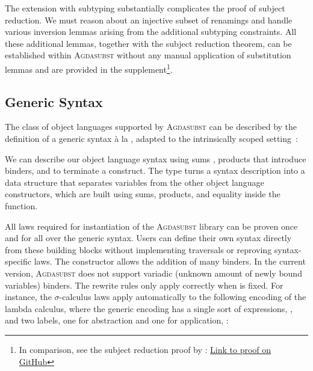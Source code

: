 \documentclass[screen,nonacm]{acmart}
\begin{document}
The extension with subtyping substantially complicates the proof of subject
reduction. We must reason about an injective subset of renamings and handle
various inversion lemmas arising from the additional subtyping constraints. All
these additional lemmas, together with the subject reduction theorem, can be
established within \textsc{Agdasubst} without any manual application of
substitution lemmas and are provided in the supplement\footnote{In comparison,
      see the subject reduction proof by \citet{saffrich:LIPIcs.ITP.2024.32}:
      \href{https://github.com/m0rphism/kitty/blob/bc86948c60f2d827593ad23e539197f9660178aa/src/Kitty/Examples/SystemFSub/SubjectReduction.agda\#L308}{Link
            to proof on GitHub}}.

\subsection{Generic Syntax}\label{sec:ext-uni}
The class of object languages supported by \textsc{Agdasubst} can be described
by the definition of a generic syntax à la
\citet{allais2021typescopesafeuniverse}, adapted to the intrinsically scoped
setting~\cite{saffrich:LIPIcs.ITP.2024.32}:

\noindent\begin{minipage}[t]{0.48\linewidth}
      \raggedright{}
      \GDesc{}
\end{minipage}
\begin{minipage}[t]{0.48\linewidth}
      \raggedright{}
      \GDenot{}
      \GTms{}
\end{minipage}

\noindent We can describe our object
language syntax using sums , products
 that introduce binders, and
 to terminate a construct. The  type turns a syntax description into a data structure that separates variables from the other object language constructors, which are built using sums, products, and equality inside the  function.

All laws required for instantiation of the \textsc{Agdasubst} library can be
proven once and for all over the generic syntax. Users can define their own
syntax directly from these building blocks without implementing traversals or
reproving syntax-specific laws. The  constructor
allows the addition of  many binders. In the current version,
\textsc{Agdasubst} does not support variadic (unknown amount of newly bound
variables) binders. The rewrite rules only apply correctly when 
is fixed. For instance, the $σ$-calculus laws apply automatically to the
following encoding of the lambda calculus, where the generic encoding has a
single sort of expressions, \GSort{}, and two labels, one for abstraction and
one for application, \GLabel{}:
\end{document}
